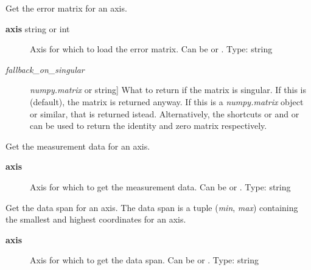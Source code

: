 \documentclass[letterpaper,10pt,english]{sphinxmanual}
\begin{document}
\begin{fulllineitems}

\begin{fulllineitems}
\label{api/kafe:kafe.dataset.Dataset.get_cov_mat}
Get the error matrix for an axis.
\begin{description}
\item[{\textbf{axis} string or int}] \leavevmode
Axis for which to load the error matrix. Can be  or . Type: string

\item[{\emph{fallback\_on\_singular}}] \leavevmode{[}\emph{numpy.matrix} or string{]}
What to return if the matrix is singular. If this is  (default), the matrix is returned anyway.
If this is a \emph{numpy.matrix} object or similar, that is returned istead. Alternatively, the shortcuts
 or  and  or  can be used to return the identity and zero matrix
respectively.

\end{description}

\end{fulllineitems}


\begin{fulllineitems}
\label{api/kafe:kafe.dataset.Dataset.get_data}
Get the measurement data for an axis.
\begin{description}
\item[{\textbf{axis}}] \leavevmode
Axis for which to get the measurement data. Can be  or . Type: string

\end{description}

\end{fulllineitems}


\begin{fulllineitems}
\label{api/kafe:kafe.dataset.Dataset.get_data_span}
Get the data span for an axis. The data span is a tuple (\emph{min}, \emph{max}) containing
the smallest and highest coordinates for an axis.
\begin{description}
\item[{\textbf{axis}}] \leavevmode
Axis for which to get the data span. Can be  or . Type: string


\end{description}
\end{fulllineitems}
\end{fulllineitems}
\end{document}
